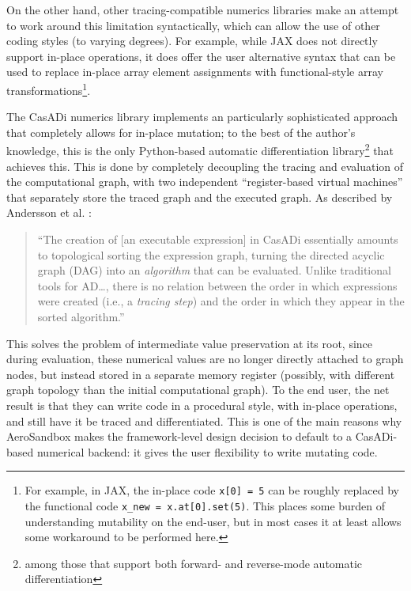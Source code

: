 On the other hand, other tracing-compatible numerics libraries make an attempt to work around this limitation syntactically, which can allow the use of other coding styles (to varying degrees). For example, while JAX \cite{jax} does not directly support in-place operations, it does offer the user alternative syntax that can be used to replace in-place array element assignments with functional-style array transformations\footnote{For example, in JAX, the in-place code \texttt{x[0] = 5} can be roughly replaced by the functional code \texttt{x_new = x.at[0].set(5)}. This places some burden of understanding mutability on the end-user, but in most cases it at least allows some workaround to be performed here.}.

The CasADi numerics library implements an particularly sophisticated approach that completely allows for in-place mutation; to the best of the author's knowledge, this is the only Python-based automatic differentiation library\footnote{among those that support both forward- and reverse-mode automatic differentiation} that achieves this. This is done by completely decoupling the tracing and evaluation of the computational graph, with two independent ``register-based virtual machines'' that separately store the traced graph and the executed graph. As described by Andersson et al. \cite{andersson_casadi_2019}:

\begin{quote}
    ``The creation of [an executable expression] in CasADi essentially amounts to topological sorting the expression graph, turning the directed acyclic graph (DAG) into an \emph{algorithm} that can be evaluated. Unlike traditional tools for AD\ldots, there is no relation between the order in which expressions were created (i.e., a \emph{tracing step}) and the order in which they appear in the sorted algorithm.''
\end{quote}

\noindent This solves the problem of intermediate value preservation at its root, since during evaluation, these numerical values are no longer directly attached to graph nodes, but instead stored in a separate memory register (possibly, with different graph topology than the initial computational graph). To the end user, the net result is that they can write code in a procedural style, with in-place operations, and still have it be traced and differentiated. This is one of the main reasons why AeroSandbox makes the framework-level design decision to default to a CasADi-based numerical backend: it gives the user flexibility to write mutating code.

